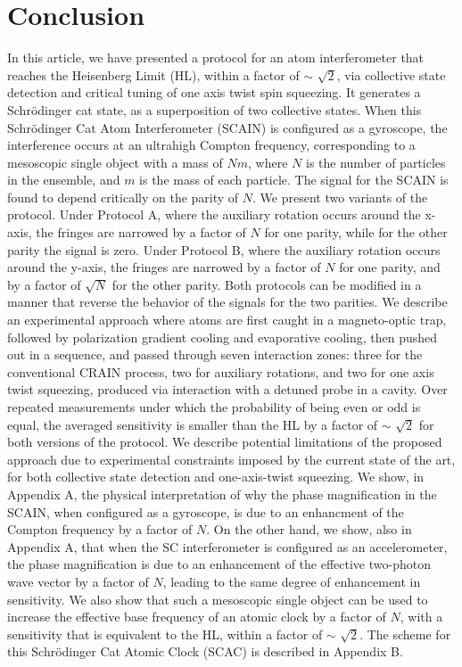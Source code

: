 \documentclass[aps,pra,letterpaper,superscriptaddress,showpacs,amsmath,floats,twocolumn]{revtex4-1}
\begin{document}
\section{Conclusion}
In this article, we have presented a protocol for an atom interferometer that reaches the Heisenberg Limit (HL), within a factor of $\sim$ $\sqrt{2}$, via collective state detection and critical tuning of one axis twist spin squeezing. It generates a Schr\"odinger cat state, as a superposition of two collective states.  When this Schr\"odinger Cat Atom Interferometer (SCAIN) is configured as a gyroscope, the interference occurs at an ultrahigh Compton frequency, corresponding to a mesoscopic single object with a mass of $Nm$, where $N$ is the number of particles in the ensemble, and $m$ is the mass of each particle.  The signal for the SCAIN is found to depend critically on the parity of $N$. We present two variants of the protocol. Under Protocol A, where the auxiliary rotation occurs around the x-axis, the fringes are narrowed by a factor of $N$ for one parity, while for the other parity the signal is zero. Under Protocol B, where the auxiliary rotation occurs around the y-axis, the fringes are narrowed by a factor of $N$ for one parity, and by a factor of $\sqrt{N}$ for the other parity. Both protocols can be modified in a manner that reverse the behavior of the signals for the two parities. We describe an experimental approach where atoms are first caught in a magneto-optic trap, followed by polarization gradient cooling and evaporative cooling, then pushed out in a sequence, and passed through seven interaction zones: three for the conventional CRAIN process, two for auxiliary rotations, and two for one axis twist squeezing, produced via interaction with a detuned probe in a cavity. Over repeated measurements under which the probability of being even or odd is equal, the averaged sensitivity is smaller than the HL by a factor of $\sim$ $\sqrt{2}$ for both versions of the protocol. We describe potential limitations of the proposed approach due to experimental constraints imposed by the current state of the art, for both collective state detection and one-axis-twist squeezing. We show, in Appendix A, the physical interpretation of why the phase magnification in the SCAIN, when configured as a gyroscope, is due to an enhancment of the Compton frequency by a factor of $N$.  On the other hand, we show, also in Appendix A, that when the SC interferometer is configured as an accelerometer, the phase magnification is due to an enhancement of the effective two-photon wave vector by a factor of $N$, leading to the same degree of enhancement in sensitivity.  We also show that such a mesoscopic single object can be used to increase the effective base frequency of an atomic clock by a factor of $N$, with a sensitivity that is equivalent to the HL, within a factor of $\sim$ $\sqrt{2}$. The scheme for this Schr\"odinger Cat Atomic Clock (SCAC) is described in Appendix B.  
\end{document}
